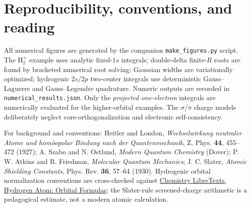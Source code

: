 \documentclass[11pt,letterpaper]{article}
\begin{document}
\section{Reproducibility, conventions, and reading}
All numerical figures are generated by the companion \texttt{make\_figures.py} script. The $\mathrm H_2^+$ example uses analytic fixed-$1s$ integrals; double-delta finite-$R$ roots are found by bracketed numerical root solving; Gaussian widths are variationally optimized; hydrogenic $2s/2p$ two-center integrals use deterministic Gauss--Laguerre and Gauss--Legendre quadrature. Numeric outputs are recorded in \texttt{numerical\_results.json}. Only the \emph{projected one-electron} integrals are numerically evaluated for the higher-orbital examples. The $\sigma$/$\pi$ charge models deliberately neglect core-orthogonalization and electronic self-consistency.

For background and conventions: Heitler and London, \emph{Wechselwirkung neutraler Atome und hom\"oopolar Bindung nach der Quantenmechanik}, Z. Phys. \textbf{44}, 455--472 (1927); A. Szabo and N. Ostlund, \emph{Modern Quantum Chemistry} (Dover); P. W. Atkins and R. Friedman, \emph{Molecular Quantum Mechanics}; J. C. Slater, \emph{Atomic Shielding Constants}, Phys. Rev. \textbf{36}, 57--64 (1930). Hydrogenic orbital normalization conventions are cross-checked against \href{https://chem.libretexts.org/Bookshelves/Physical_and_Theoretical_Chemistry_Textbook_Maps/Supplemental_Modules_(Physical_and_Theoretical_Chemistry)/Quantum_Mechanics/09._The_Hydrogen_Atom/Chapter_7.__The_Hydrogen_Atom}{Chemistry LibreTexts, Hydrogen Atom: Orbital Formulas}; the Slater-rule screened-charge arithmetic is a pedagogical estimate, not a modern atomic calculation.
\end{document}
